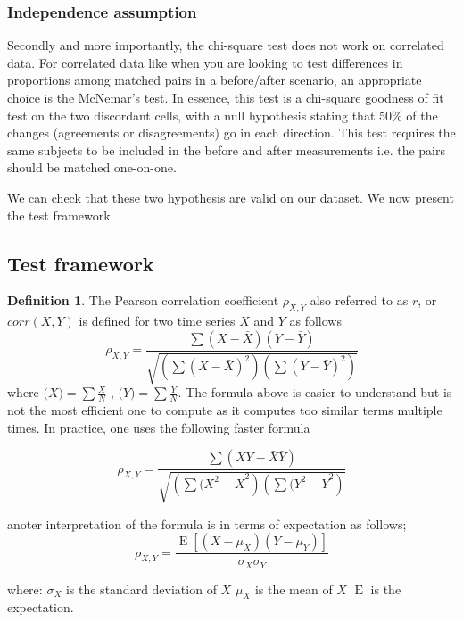 \documentclass[a4paper]{article}
\theoremstyle{definition}
\theoremstyle{proposition}
\newtheorem{definition}{Definition}[section]
\begin{document}
\subsubsection{Independence assumption}
Secondly and more importantly, the chi-square test does not work on correlated data. For correlated data like when you are looking to test differences in proportions among matched pairs in a before/after scenario, an appropriate choice is the McNemar's test. In essence, this test is a chi-square goodness of fit test on the two discordant cells, with a null hypothesis stating that 50\% of the changes (agreements or disagreements) go in each direction. This test requires the same subjects to be included in the before and after measurements i.e. the pairs should be matched one-on-one.  

We can check that these two hypothesis are valid on our dataset. We now present the test framework.

\subsection{Test framework}
\begin{definition}
The Pearson correlation coefficient $\rho_{X,Y}$  also referred to as $r$, or $corr(X,Y)$  is defined for two time series $X$ and $Y$ as follows
\begin{equation}
\rho_{X,Y}= \frac{\sum ( X - \bar{X}) ( Y - \bar{Y} ) }  { \sqrt{  \left( \sum (X - \bar{X}) ^2 \right) \left(  \sum  (Y- \bar{Y}) ^2  \right) } }
\end{equation}
where $\bar(X) = \sum \frac{X}{N}$ , $\bar(Y) = \sum \frac{Y}{N}$. The formula above is easier to understand but is not the most efficient one to compute as it computes too similar terms multiple times. In practice, one uses the following faster formula

\begin{equation}
\rho_{X,Y} = \frac{\sum ( X Y - \bar{X} \bar{Y} ) }  { \sqrt{  \left( \sum (X^2 - \bar{X}^2 \right) \left(  \sum  (Y^2 - \bar{Y} ^2  \right) } }
\end{equation}

anoter interpretation of the formula is in terms of expectation as follows;
\[
\rho_{X,Y}=\frac{\operatorname{E}[(X-\mu_X)(Y-\mu_Y)]}{\sigma_X\sigma_Y} 
\]

where:
$\sigma_X $  is the standard deviation of $X$
$\mu_X$ is the mean of $X$
$\operatorname{E}$ is the expectation.

\end{definition}
\end{document}
